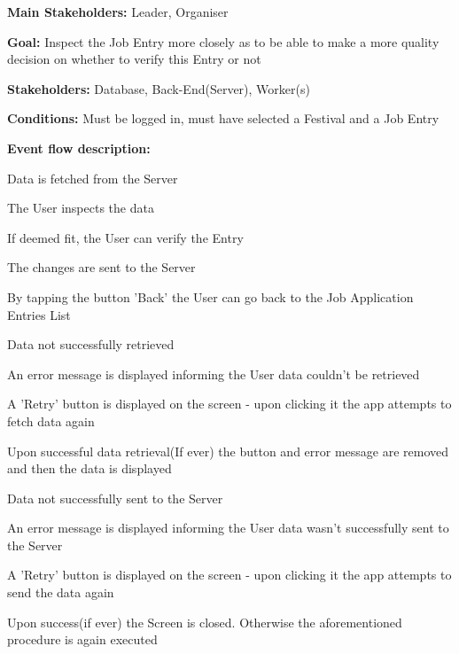 			\noindent {}
			\begin{packed_item}
				\item \textbf{Main Stakeholders:} Leader, Organiser
				\item \textbf{Goal:} Inspect the Job Entry more closely as to be able to make a more quality decision on whether to verify this Entry or not
				\item \textbf{Stakeholders: } Database, Back-End(Server), Worker(s)
				\item \textbf{Conditions: } Must be logged in, must have selected a Festival and a Job Entry
				\item \textbf{Event flow description: }
				\begin{packed_enum}
					\item Data is fetched from the Server
					\item The User inspects the data
					\item If deemed fit, the User can verify the Entry
					\item The changes are sent to the Server
					\item By tapping the button 'Back' the User can go back to the Job Application Entries List
				\end{packed_enum}
				
				\begin{packed_item}
					\item[1.a] Data not successfully retrieved
					\item[] \begin{packed_enum}
						\item An error message is displayed informing the User data couldn't be retrieved
						\item A 'Retry' button is displayed on the screen - upon clicking it the app attempts to fetch data again
						\item Upon successful data retrieval(If ever) the button and error message are removed and then the data is displayed
					\end{packed_enum}
				
					\item[4.a] Data not successfully sent to the Server
					\item[] \begin{packed_enum}
						\item An error message is displayed informing the User data wasn't successfully sent to the Server
						\item A 'Retry' button is displayed on the screen - upon clicking it the app attempts to send the data again
						\item Upon success(if ever) the Screen is closed. Otherwise the aforementioned procedure is again executed
					\end{packed_enum}
				\end{packed_item}
			\end{packed_item}
			
